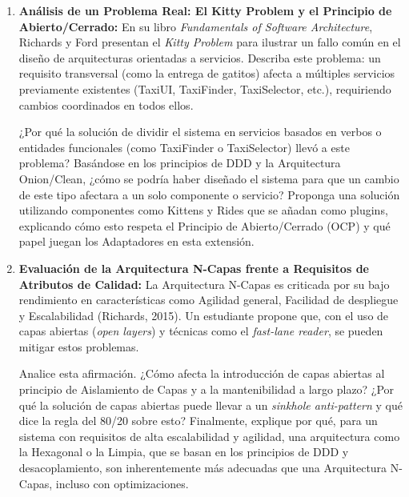 \documentclass[12pt,a4paper]{article}
\begin{document}
\begin{enumerate}[label=\textbf{\arabic*.}, leftmargin=*, itemsep=1.2em]
  \item \textbf{Análisis de un Problema Real: El Kitty Problem y el Principio de Abierto/Cerrado:}
  En su libro \emph{Fundamentals of Software Architecture}, Richards y Ford presentan el \emph{Kitty Problem} para ilustrar un fallo común en el diseño de arquitecturas orientadas a servicios. Describa este problema: un requisito transversal (como la entrega de gatitos) afecta a múltiples servicios previamente existentes (TaxiUI, TaxiFinder, TaxiSelector, etc.), requiriendo cambios coordinados en todos ellos.

  ¿Por qué la solución de dividir el sistema en servicios basados en verbos o entidades funcionales (como TaxiFinder o TaxiSelector) llevó a este problema? Basándose en los principios de DDD y la Arquitectura Onion/Clean, ¿cómo se podría haber diseñado el sistema para que un cambio de este tipo afectara a un solo componente o servicio? Proponga una solución utilizando componentes como Kittens y Rides que se añadan como plugins, explicando cómo esto respeta el Principio de Abierto/Cerrado (OCP) y qué papel juegan los Adaptadores en esta extensión.

  \item \textbf{Evaluación de la Arquitectura N-Capas frente a Requisitos de Atributos de Calidad:}
  La Arquitectura N-Capas es criticada por su bajo rendimiento en características como Agilidad general, Facilidad de despliegue y Escalabilidad (Richards, 2015). Un estudiante propone que, con el uso de capas abiertas (\emph{open layers}) y técnicas como el \emph{fast-lane reader}, se pueden mitigar estos problemas.

  Analice esta afirmación. ¿Cómo afecta la introducción de capas abiertas al principio de Aislamiento de Capas y a la mantenibilidad a largo plazo? ¿Por qué la solución de capas abiertas puede llevar a un \emph{sinkhole anti-pattern} y qué dice la regla del 80/20 sobre esto? Finalmente, explique por qué, para un sistema con requisitos de alta escalabilidad y agilidad, una arquitectura como la Hexagonal o la Limpia, que se basan en los principios de DDD y desacoplamiento, son inherentemente más adecuadas que una Arquitectura N-Capas, incluso con optimizaciones.

\end{enumerate}

\newpage







\end{document}
